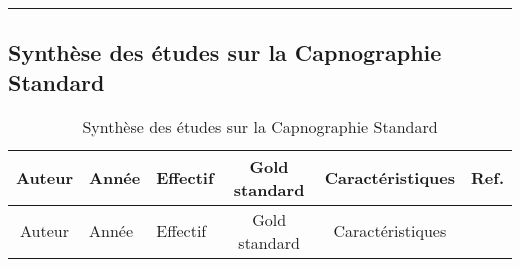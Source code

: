 \documentclass[12pt,]{article}
\begin{document}
\newpage
\begin{landscape}

\begin{center}\rule{0.5\linewidth}{0.5pt}\end{center}

\hypertarget{synthuxe8se-des-uxe9tudes-sur-la-capnographie-standard-2}{%
\subsection{Synthèse des études sur la Capnographie
Standard}\label{synthuxe8se-des-uxe9tudes-sur-la-capnographie-standard-2}}

\begin{longtable}[]{@{}cllccl@{}}
\caption{Synthèse des études sur la Capnographie
Standard}\tabularnewline
\toprule
\begin{minipage}[b]{0.09\columnwidth}\centering
Auteur\strut
\end{minipage} & \begin{minipage}[b]{0.05\columnwidth}\raggedright
Année\strut
\end{minipage} & \begin{minipage}[b]{0.08\columnwidth}\raggedright
Effectif\strut
\end{minipage} & \begin{minipage}[b]{0.14\columnwidth}\centering
Gold standard\strut
\end{minipage} & \begin{minipage}[b]{0.40\columnwidth}\centering
Caractéristiques\strut
\end{minipage} & \begin{minipage}[b]{0.08\columnwidth}\raggedright
Ref.\strut
\end{minipage}\tabularnewline
\midrule
\endfirsthead
\toprule
\begin{minipage}[b]{0.09\columnwidth}\centering
Auteur\strut
\end{minipage} & \begin{minipage}[b]{0.05\columnwidth}\raggedright
Année\strut
\end{minipage} & \begin{minipage}[b]{0.08\columnwidth}\raggedright
Effectif\strut
\end{minipage} & \begin{minipage}[b]{0.14\columnwidth}\centering
Gold standard\strut
\end{minipage} & \begin{minipage}[b]{0.40\columnwidth}\centering
Caractéristiques\strut

\end{minipage}
\end{longtable}
\end{landscape}
\end{document}
